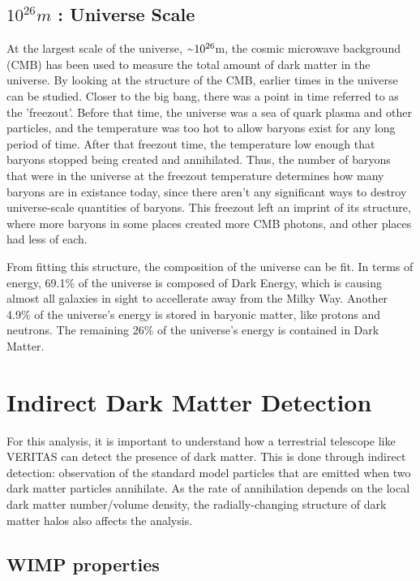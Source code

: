 \subsection{$10^{26}m$ : Universe Scale}
%
At the largest scale of the universe, $\nicetilde 10^{26}$m, the cosmic microwave background (CMB) has been used to measure the total amount of dark matter in the universe.
By looking at the structure of the CMB, earlier times in the universe can be studied.
Closer to the big bang, there was a point in time referred to as the 'freezout'.
Before that time, the universe was a sea of quark plasma and other particles, and the temperature was too hot to allow baryons exist for any long period of time.
After that freezout time, the temperature low enough that baryons stopped being created and annihilated.
Thus, the number of baryons that were in the universe at the freezout temperature determines how many baryons are in existance today, since there aren't any significant ways to destroy universe-scale quantities of baryons.
This freezout left an imprint of its structure, where more baryons in some places created more CMB photons, and other places had less of each.

From fitting this structure, the composition of the universe can be fit.
In terms of energy, 69.1\% of the universe is composed of Dark Energy, which is causing almost all galaxies in sight to accellerate away from the Milky Way.
Another 4.9\% of the universe's energy is stored in baryonic matter, like protons and neutrons.
The remaining 26\% of the universe's energy is contained in Dark Matter\cite{planck2015}.


\section{Indirect Dark Matter Detection}

For this analysis, it is important to understand how a terrestrial telescope like VERITAS can detect the presence of dark matter.
This is done through indirect detection: observation of the standard model particles that are emitted when two dark matter particles annihilate.
As the rate of annihilation depends on the local dark matter number/volume density, the radially-changing structure of dark matter halos also affects the analysis.

\subsection{WIMP properties}

